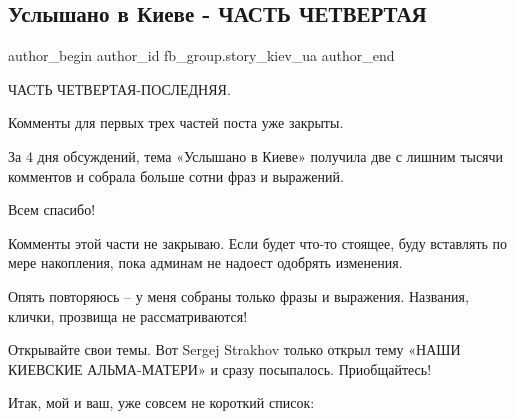  
 
 
 
 
 
\subsection{Услышано в Киеве - ЧАСТЬ ЧЕТВЕРТАЯ}
\label{sec:23_07_2021.fb.fb_group.story_kiev_ua.1.uslyshano_v_kieve_4}
 
\ifcmt
 author_begin
   author_id fb_group.story_kiev_ua
 author_end
\fi

ЧАСТЬ ЧЕТВЕРТАЯ-ПОСЛЕДНЯЯ.

Комменты для первых трех частей поста уже закрыты.

За 4 дня обсуждений, тема «Услышано в Киеве» получила две с лишним тысячи
комментов и собрала больше сотни фраз и выражений.

Всем спасибо!

Комменты этой части не закрываю. Если будет что-то стоящее, буду вставлять по
мере накопления, пока админам не надоест одобрять изменения.

Опять повторяюсь – у меня собраны только фразы и выражения. Названия, клички,
прозвища не рассматриваются!

Открывайте свои темы. Вот Sergej Strakhov только открыл тему «НАШИ КИЕВСКИЕ
АЛЬМА-МАТЕРИ» и сразу посыпалось. Приобщайтесь!

Итак, мой и ваш, уже совсем не короткий список:

